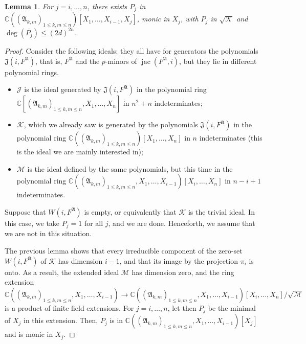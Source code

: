 \documentclass[12pt]{article}
\def\frkJ{\mathfrak{J}}
\def\A{\mathfrak{A}}
\DeclareMathOperator{\jac}{jac}
\def\C{\mathbb{C}}
\newtheorem{lemma}[theorem]{Lemma}
\begin{document}
\begin{lemma}\label{lemma:boundP}
  For $j = i,\dots,n$, there exists $P_j$ in $\C((\A_{k,m})_{1 \le k,m
    \le n})[X_1,\dots,X_{i-1},X_j]$, monic in $X_j$, with $P_{j}$ in
  $\sqrt{\mathscr{K}}$ and $\deg(\overline{ P_j})\leq (2d)^{2n}.$
\end{lemma}
\begin{proof} 
  Consider the following ideals: they all have for generators the
  polynomials $\frkJ(i,F^\A)$, that is, $F^\A$ and the $p$-minors of
  $\jac(F^\A, i)$, but they lie in different polynomial rings.
  \begin{itemize}
  \item $\mathscr{J}$ is the ideal generated by $\frkJ(i,F^\A)$ in the
    polynomial ring $\C[(\A_{k,m})_{1 \le k,m \le n},X_1,\dots,X_n]$
    in $n^2+n$ indeterminates;
  \item $\mathscr{K}$, which we already saw is generated by the
    polynomials $\frkJ(i,F^\A)$ in the polynomial ring  $\C((\A_{k,m})_{1 \le k,m \le
      n})[X_1,\dots,X_n]$ in $n$ indeterminates (this is the ideal we
    are mainly interested in);
  \item $\mathscr{M}$ is the ideal defined by the same polynomials,
    but this time in the polynomial ring $\C((\A_{k,m})_{1 \le k,m \le
      n},X_1,\dots,X_{i-1})[X_{i},\dots,X_n]$ in $n-i+1$ indeterminates.
  \end{itemize}
   Suppose that
  $W(i,F^\A)$ is empty, or equivalently that $\mathscr{K}$ is the
  trivial ideal. In this case, we take $P_j=1$ for all $j$, and we are
  done. Henceforth, we assume that we are not in this situation.

  \smallskip{}  The previous
  lemma shows that every irreducible component of the zero-set
  $W(i,F^\A)$ of $\mathscr{K}$ has dimension $i-1$, and that its image
  by the projection $\pi_i$ is onto. As a result, the extended ideal
  $\mathscr{M}$ has dimension zero, and the ring extension
  \[  \C((\A_{k,m})_{1 \le k,m \le
    n},X_1,\dots,X_{i-1}) \to \C((\A_{k,m})_{1 \le k,m \le
    n},X_1,\dots,X_{i-1})[X_{i},\dots,X_n]/\sqrt{\mathscr{M}}\] is a product
  of finite field extensions. For $j=i,\dots,n$, let then $P_j$ be the
  minimal of $X_j$ in this extension. Then, $P_j$ is in
  $\C((\A_{k,m})_{1 \le k,m \le n},X_1,\dots,X_{i-1})[X_j]$ and is
  monic in $X_j$.


\end{proof}
\end{document}
